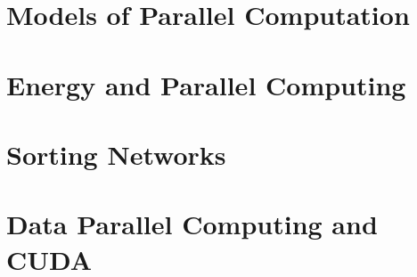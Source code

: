 \documentclass{article}
\begin{document}



\section{Models of Parallel Computation}




\section{Energy and Parallel Computing}



\pagebreak

\section{Sorting Networks}



\pagebreak

\section{Data Parallel Computing and CUDA}



\appendix
\end{document}

